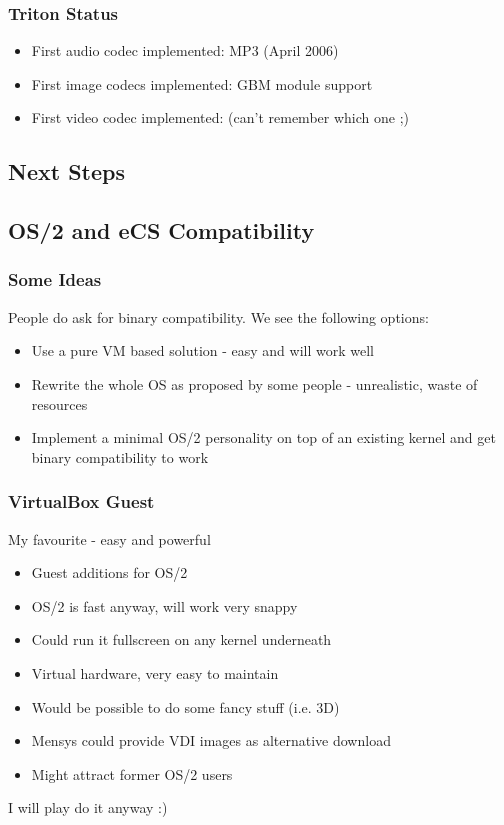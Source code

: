 \documentclass{beamer}
\begin{document}
\begin{frame}
\frametitle{Triton Status}
\begin{itemize}[<+->]
  \item First audio codec implemented: MP3 (April 2006)
  \item First image codecs implemented: GBM module support
  \item First video codec implemented: (can't remember which one ;)
\end{itemize}
\end{frame}

\subsection{Next Steps}

\subsection{OS/2 and eCS Compatibility}
\begin{frame}
\frametitle{Some Ideas}
People do ask for binary compatibility. We see the following options:
\begin{itemize}[<+->]
  \item Use a pure VM based solution - easy and will work well
  \item Rewrite the whole OS as proposed by some people - unrealistic, waste of resources
  \item Implement a minimal OS/2 personality on top of an existing kernel and get binary compatibility to work
\end{itemize}
\end{frame}

\begin{frame}
\frametitle{VirtualBox Guest}
My favourite - easy and powerful
\begin{itemize}[<+->]
  \item Guest additions for OS/2
  \item OS/2 is fast anyway, will work very snappy
  \item Could run it fullscreen on any kernel underneath
  \item Virtual hardware, very easy to maintain
  \item Would be possible to do some fancy stuff (i.e. 3D)
  \item Mensys could provide VDI images as alternative download
  \item Might attract former OS/2 users
\end{itemize}
I will play do it anyway :)
\end{frame}
\end{document}

